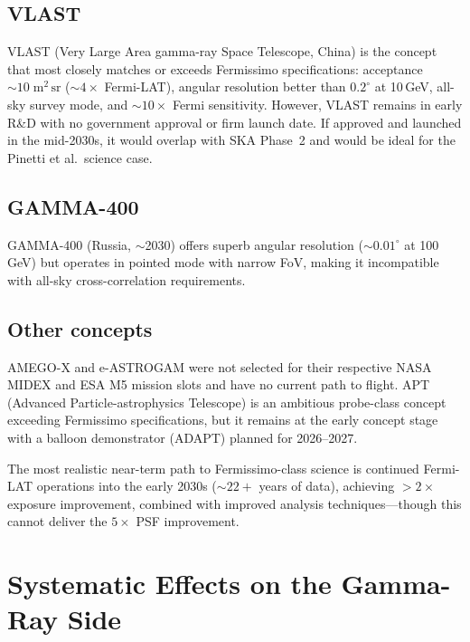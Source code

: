 \documentclass[10pt,a4paper]{article}
\begin{document}
\subsection{VLAST}

VLAST (Very Large Area gamma-ray Space Telescope, China) is the concept that most closely matches or exceeds Fermissimo specifications: acceptance $\sim10\;\mathrm{m^2\,sr}$ ($\sim4\times$ Fermi-LAT), angular resolution better than $0.2^\circ$ at 10\,GeV, all-sky survey mode, and $\sim10\times$ Fermi sensitivity. However, VLAST remains in early R\&D with no government approval or firm launch date. If approved and launched in the mid-2030s, it would overlap with SKA Phase~2 and would be ideal for the Pinetti et al.\ science case.

\subsection{GAMMA-400}

GAMMA-400 (Russia, $\sim$2030) offers superb angular resolution ($\sim0.01^\circ$ at 100\,GeV) but operates in pointed mode with narrow FoV, making it incompatible with all-sky cross-correlation requirements.

\subsection{Other concepts}

AMEGO-X and e-ASTROGAM were not selected for their respective NASA MIDEX and ESA M5 mission slots and have no current path to flight. APT (Advanced Particle-astrophysics Telescope) is an ambitious probe-class concept exceeding Fermissimo specifications, but it remains at the early concept stage with a balloon demonstrator (ADAPT) planned for 2026--2027.

The most realistic near-term path to Fermissimo-class science is continued Fermi-LAT operations into the early 2030s ($\sim22+$ years of data), achieving $>2\times$ exposure improvement, combined with improved analysis techniques---though this cannot deliver the $5\times$ PSF improvement.


\section{Systematic Effects on the Gamma-Ray Side}
\label{sec:systematics}
\end{document}
